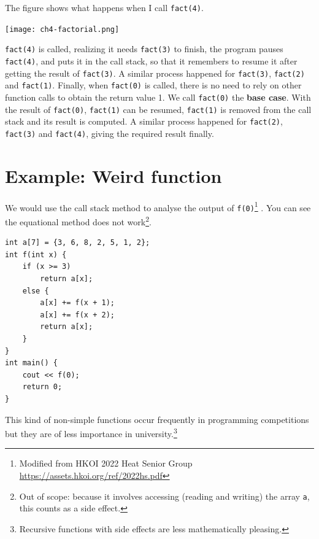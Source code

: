 The figure shows what happens when I call \texttt{fact(4)}.

\texttt{[image: ch4-factorial.png]}

\texttt{fact(4)} is called, realizing it needs \texttt{fact(3)} to finish, the program pauses \texttt{fact(4)}, and puts it in the call stack, so that it remembers to resume it after getting the result of \texttt{fact(3)}. A similar process happened for \texttt{fact(3)}, \texttt{fact(2)} and \texttt{fact(1)}. Finally, when \texttt{fact(0)} is called, there is no need to rely on other function calls to obtain the return value 1. We call \texttt{fact(0)} the \textbf{base case}. With the result of \texttt{fact(0)}, \texttt{fact(1)} can be resumed, \texttt{fact(1)} is removed from the call stack and its result is computed. A similar process happened for \texttt{fact(2)}, \texttt{fact(3)} and \texttt{fact(4)}, giving the required result finally.
\vspace{6mm}

\section{Example: Weird function}

We would use the call stack method to analyse the output of \texttt{f(0)}\footnote{Modified from HKOI 2022 Heat Senior Group \url{https://assets.hkoi.org/ref/2022hs.pdf}} . You can see the equational method does not work\footnote{Out of scope: because it involves accessing (reading and writing) the array \texttt{a}, this counts as a side effect.}.

\begin{lstlisting}
int a[7] = {3, 6, 8, 2, 5, 1, 2};
int f(int x) {
    if (x >= 3)
        return a[x];
    else {
        a[x] += f(x + 1);
        a[x] += f(x + 2);
        return a[x];
    }
}
int main() {
    cout << f(0);
    return 0;
} 
\end{lstlisting}

This kind of non-simple functions occur frequently in programming competitions but they are of less importance in university.\footnote{Recursive functions with side effects are less mathematically pleasing.}

